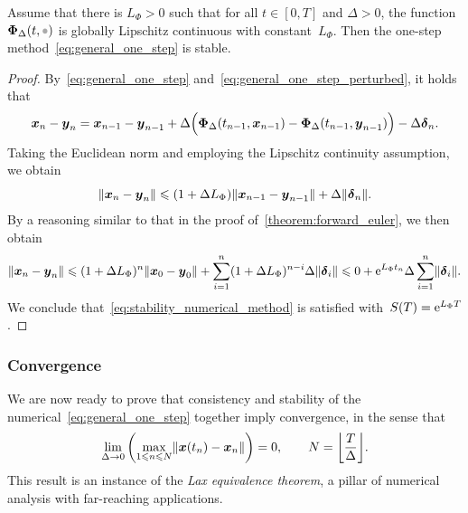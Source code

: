 \begin{proposition}
    Assume that there is $L_{\Phi} > 0$ such that for all $t \in [0, T]$ and $\Delta > 0$,
    the function $\vect \Phi_{\Delta}(t, \placeholder)$ is globally Lipschitz continuous with constant~$L_{\Phi}$.
    Then the one-step method~\eqref{eq:general_one_step} is stable.
\end{proposition}
\begin{proof}
    By~\eqref{eq:general_one_step} and~\eqref{eq:general_one_step_perturbed},
    it holds that
    \[
        \mathbf{\boldsymbol{x}}_{n} - \mathbf{\boldsymbol{y}}_{n}
        = \mathbf{\boldsymbol{x}}_{n-1} - \mathbf{\boldsymbol{y}}_{n-1}
        + \Delta \Bigl( \mathbf{\boldsymbol{\Phi}}_{\Delta}(t_{n-1}, \mathbf{\boldsymbol{x}}_{n-1}) - \mathbf{\boldsymbol{\Phi}}_{\Delta}(t_{n-1}, \mathbf{\boldsymbol{y}}_{n-1}) \Bigr)
        - \Delta \mathbf{\boldsymbol{\delta}}_{n}.
    \]
    Taking the Euclidean norm and employing the Lipschitz continuity assumption,
    we obtain
    \[
        \lVert \mathbf{\boldsymbol{x}}_{n} - \mathbf{\boldsymbol{y}}_{n} \rVert
        \leqslant (1 + \Delta L_{\Phi}) \lVert \mathbf{\boldsymbol{x}}_{n-1} - \mathbf{\boldsymbol{y}}_{n-1} \rVert
        + \Delta \lVert \mathbf{\boldsymbol{\delta}}_{n} \rVert.
    \]
    By a reasoning similar to that in the proof of~\cref{theorem:forward_euler},
    we then obtain
    \[
        \lVert \mathbf{\boldsymbol{x}}_{n} - \mathbf{\boldsymbol{y}}_{n} \rVert
        \leqslant (1 + \Delta L_{\Phi})^{n} \lVert \mathbf{\boldsymbol{x}}_{0} - \mathbf{\boldsymbol{y}}_{0} \rVert + \sum_{i=1}^{n} (1 + \Delta L_{\Phi})^{n-i} \Delta \lVert\mathbf{\boldsymbol{\delta}}_{i}\rVert
        \leqslant 0 + \mathrm e^{L_{\Phi} t_n} \Delta \sum_{i=1}^{n}\lVert\mathbf{\boldsymbol{\delta}}_{i}\rVert.
    \]
    We conclude that~\eqref{eq:stability_numerical_method} is satisfied with~$S(T) = \mathrm e^{L_{\Phi} T}$.
\end{proof}

\subsubsection*{Convergence}%
We are now ready to prove that consistency and stability of the numerical~\eqref{eq:general_one_step} together imply convergence,
in the sense that
\[
    \lim_{\Delta \to 0} \left( \max_{1 \leq n \leq N}  \vecnorm{ \vect x(t_n) - \vect x_n } \right) = 0, \qquad  N = \floor*{\frac{T}{\Delta}}.
\]
This result is an instance of the \emph{Lax equivalence theorem},
a pillar of numerical analysis with far-reaching applications.

